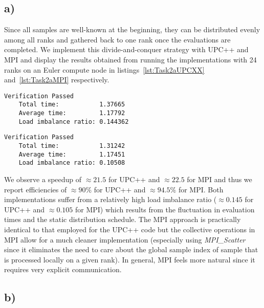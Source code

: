 \documentclass[11pt]{article}
\begin{document}
    \subsection*{a)}
    \label{subsec:Task2a}

    Since all samples are well-known at the beginning, they can be distributed
    evenly among all ranks and gathered back to one rank once the evaluations
    are completed.
    We implement this divide-and-conquer strategy with UPC++ and MPI and
    display the results obtained from running the implementations with 24
    ranks on an Euler compute node in listings~\ref{lst:Task2aUPCXX}
    and~\ref{lst:Task2aMPI} respectively.

    \begin{lstlisting}[basicstyle=\tiny, frame=single, caption={Output from
    executing the UPC++ tasking engine with the divide-and-conquer strategy.},
    label={lst:Task2aUPCXX}]
    Verification Passed
    Total time:           1.37665
    Average time:         1.17792
    Load imbalance ratio: 0.144362
    \end{lstlisting}

    \begin{lstlisting}[basicstyle=\tiny, frame=single, caption={Output from
    executing the MPI tasking engine with the divide-and-conquer strategy.},
    label={lst:Task2aMPI}]
    Verification Passed
    Total time:           1.31242
    Average time:         1.17451
    Load imbalance ratio: 0.10508
    \end{lstlisting}

    We observe a speedup of $\approx 21.5$ for UPC++ and $\approx 22.5$ for
    MPI and thus we report efficiencies of $\approx 90\%$ for UPC++ and
    $\approx 94.5\%$ for MPI.\@
    Both implementations suffer from a relatively high load imbalance ratio
    ($\approx 0.145$ for UPC++ and $\approx 0.105$ for MPI) which results
    from the fluctuation in evaluation times and the static distribution
    schedule.
    The MPI approach is practically identical to that employed for the UPC++
    code but the collective operations in MPI allow for a much cleaner
    implementation (especially using \textit{MPI\_Scatter} since it eliminates
    the need to care about the global sample index of sample that is processed
    locally on a given rank).
    In general, MPI feels more natural since it requires very explicit
    communication.

    \subsection*{b)}
    \label{subsec:Task2b}
\end{document}

